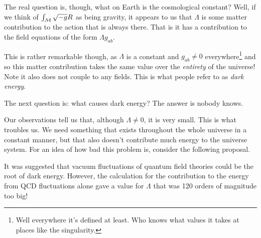 The real question is, though, what on Earth is the cosmological constant? Well, if we think of $\int_{\mathcal{M}}\sqrt{-g}R$ as being gravity, it appears to us that $\Lambda$ is some matter contribution to the action that is always there. That is it has a contribution to the  field equations of the form $\Lambda g_{ab}$. 

This is rather remarkable though, as $\Lambda$ is a constant and $g_{ab}\neq 0$ everywhere\footnote{Well everywhere it's defined at least. Who knows what values it takes at places like the singularity.} and so this matter contribution takes the same value over the \textit{entirety} of the universe! Note it also does not couple to any fields. This is what people refer to as \textit{dark energy}.

The next question is: what causes dark energy? The answer is nobody knows. 

Our observations tell us that, although $\Lambda\neq 0$, it is very small. This is what troubles us. We need something that exists throughout the whole universe in a constant manner, but that also doesn't contribute much energy to the universe system. For an idea of how bad this problem is, consider the following proposal. 

It was suggested that vacuum fluctuations of quantum field theories could be the root of dark energy. However, the calculation for the contribution to the energy from QCD fluctuations alone gave a value for $\Lambda$ that was 120 orders of magnitude too big!